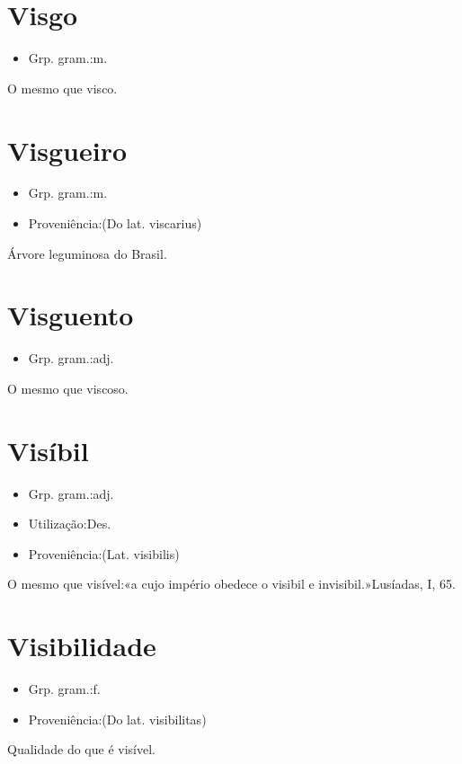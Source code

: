 \documentclass{article}
\begin{document}
\section{Visgo}
\begin{itemize}
\item {Grp. gram.:m.}
\end{itemize}
O mesmo que \textunderscore visco\textunderscore .
\section{Visgueiro}
\begin{itemize}
\item {Grp. gram.:m.}
\end{itemize}
\begin{itemize}
\item {Proveniência:(Do lat. \textunderscore viscarius\textunderscore )}
\end{itemize}
Árvore leguminosa do Brasil.
\section{Visguento}
\begin{itemize}
\item {Grp. gram.:adj.}
\end{itemize}
O mesmo que \textunderscore viscoso\textunderscore .
\section{Visíbil}
\begin{itemize}
\item {Grp. gram.:adj.}
\end{itemize}
\begin{itemize}
\item {Utilização:Des.}
\end{itemize}
\begin{itemize}
\item {Proveniência:(Lat. \textunderscore visibilis\textunderscore )}
\end{itemize}
O mesmo que \textunderscore visível\textunderscore :«\textunderscore a cujo império obedece o visibil e invisibil.\textunderscore »\textunderscore Lusíadas\textunderscore , I, 65.
\section{Visibilidade}
\begin{itemize}
\item {Grp. gram.:f.}
\end{itemize}
\begin{itemize}
\item {Proveniência:(Do lat. \textunderscore visibilitas\textunderscore )}
\end{itemize}
Qualidade do que é visível.
\end{document}
